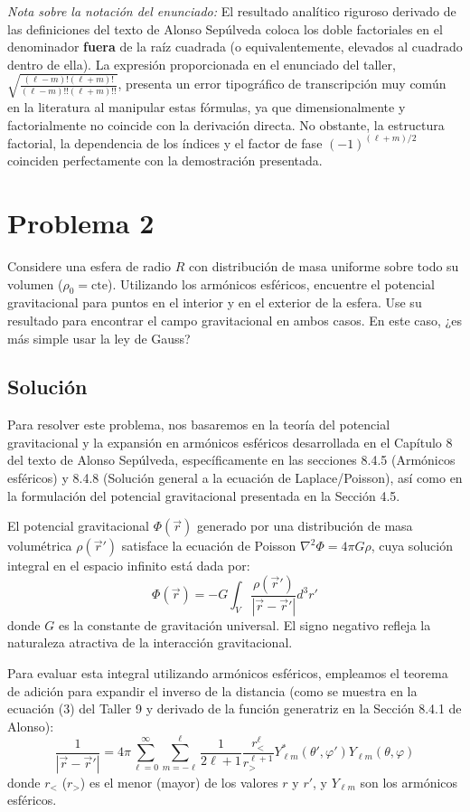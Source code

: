 \documentclass[a4paper]{article}
\begin{document}
\noindent\textit{Nota sobre la notación del enunciado:} El resultado analítico riguroso derivado de las definiciones del texto de Alonso Sepúlveda coloca los doble factoriales en el denominador \textbf{fuera} de la raíz cuadrada (o equivalentemente, elevados al cuadrado dentro de ella). La expresión proporcionada en el enunciado del taller, $\sqrt{\frac{(\ell-m)!(\ell+m)!}{(\ell-m)!!(\ell+m)!!}}$, presenta un error tipográfico de transcripción muy común en la literatura al manipular estas fórmulas, ya que dimensionalmente y factorialmente no coincide con la derivación directa. No obstante, la estructura factorial, la dependencia de los índices y el factor de fase $(-1)^{(\ell+m)/2}$ coinciden perfectamente con la demostración presentada.

\section{Problema 2}
Considere una esfera de radio $R$ con distribución de masa uniforme sobre todo su volumen ($\rho_0 = \text{cte}$). Utilizando los armónicos esféricos, encuentre el potencial gravitacional para puntos en el interior y en el exterior de la esfera. Use su resultado para encontrar el campo gravitacional en ambos casos. En este caso, ¿es más simple usar la ley de Gauss?

\subsection{Solución}
Para resolver este problema, nos basaremos en la teoría del potencial gravitacional y la expansión en armónicos esféricos desarrollada en el Capítulo 8 del texto de Alonso Sepúlveda, específicamente en las secciones 8.4.5 (Armónicos esféricos) y 8.4.8 (Solución general a la ecuación de Laplace/Poisson), así como en la formulación del potencial gravitacional presentada en la Sección 4.5.

El potencial gravitacional $\Phi(\vec{r})$ generado por una distribución de masa volumétrica $\rho(\vec{r}')$ satisface la ecuación de Poisson $\nabla^2 \Phi = 4\pi G \rho$, cuya solución integral en el espacio infinito está dada por:
$$
\Phi(\vec{r}) = -G \int_V \frac{\rho(\vec{r}')}{|\vec{r} - \vec{r}'|} d^3r'
$$
donde $G$ es la constante de gravitación universal. El signo negativo refleja la naturaleza atractiva de la interacción gravitacional.

Para evaluar esta integral utilizando armónicos esféricos, empleamos el teorema de adición para expandir el inverso de la distancia (como se muestra en la ecuación (3) del Taller 9 y derivado de la función generatriz en la Sección 8.4.1 de Alonso):
$$
\frac{1}{|\vec{r} - \vec{r}'|} = 4\pi \sum_{\ell=0}^{\infty} \sum_{m=-\ell}^{\ell} \frac{1}{2\ell+1} \frac{r_{<}^\ell}{r_{>}^{\ell+1}} Y_{\ell m}^*(\theta', \varphi') Y_{\ell m}(\theta, \varphi)
$$
donde $r_{<}$ ($r_{>}$) es el menor (mayor) de los valores $r$ y $r'$, y $Y_{\ell m}$ son los armónicos esféricos.
\end{document}
